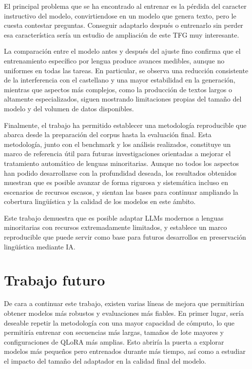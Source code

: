 El principal problema que se ha encontrado al entrenar es la pérdida del caracter instructivo del modelo, convirtiendose en un modelo que genera texto, pero le cuesta contestar preguntas. Conseguir adaptarlo después o entrenarlo sin perder esa característica sería un estudio de ampliación de este TFG muy interesante.

La comparación entre el modelo antes y después del ajuste fino confirma que el entrenamiento específico por lengua produce avances medibles, aunque no uniformes en todas las tareas. En particular, se observa una reducción consistente de la interferencia con el castellano y una mayor estabilidad en la generación, mientras que aspectos más complejos, como la producción de textos largos o altamente especializados, siguen mostrando limitaciones propias del tamaño del modelo y del volumen de datos disponibles.

Finalmente, el trabajo ha permitido establecer una metodología reproducible que abarca desde la preparación del corpus hasta la evaluación final. Esta metodología, junto con el benchmark y los análisis realizados, constituye un marco de referencia útil para futuras investigaciones orientadas a mejorar el tratamiento automático de lenguas minoritarias. Aunque no todos los aspectos han podido desarrollarse con la profundidad deseada, los resultados obtenidos muestran que es posible avanzar de forma rigurosa y sistemática incluso en escenarios de recursos escasos, y sientan las bases para continuar ampliando la cobertura lingüística y la calidad de los modelos en este ámbito.

Este trabajo demuestra que es posible adaptar LLMs modernos a lenguas minoritarias con recursos extremadamente limitados, y establece un marco reproducible que puede servir como base para futuros desarrollos en preservación lingüística mediante IA.

\section{Trabajo futuro}

De cara a continuar este trabajo, existen varias líneas de mejora que permitirían obtener modelos más robustos y evaluaciones más fiables. En primer lugar, sería deseable repetir la metodología con una mayor capacidad de cómputo, lo que permitiría entrenar con secuencias más largas, tamaños de lote mayores y configuraciones de QLoRA más amplias. Esto abriría la puerta a explorar modelos más pequeños pero entrenados durante más tiempo, así como a estudiar el impacto del tamaño del adaptador en la calidad final del modelo.

